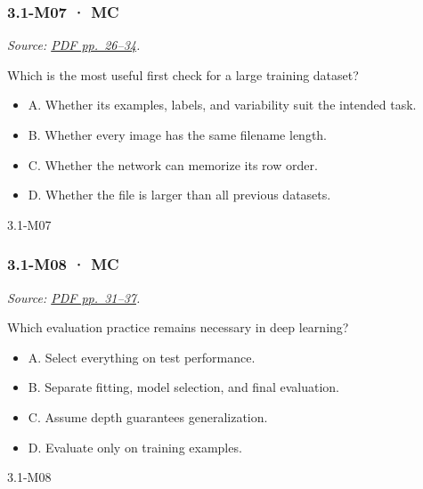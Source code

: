 \noindent\begin{minipage}{\linewidth}

\subsubsection{3.1-M07 · MC}\label{m07-mc-7}

\emph{Source:
\href{../Lecture\%20Slides/3.1.\%20Introduction\%20to\%20Deep\%20Learning.pdf\#page=26}{PDF
pp.~26--34}.}

Which is the most useful first check for a large training dataset?

\begin{itemize}
\tightlist
\item
  A. Whether its examples, labels, and variability suit the intended
  task.
\item
  B. Whether every image has the same filename length.
\item
  C. Whether the network can memorize its row order.
\item
  D. Whether the file is larger than all previous datasets.
\end{itemize}

\begin{solution}[8mm]{3.1-M07}

\end{solution}
\end{minipage}\par\medskip

\noindent\begin{minipage}{\linewidth}

\subsubsection{3.1-M08 · MC}\label{m08-mc-7}

\emph{Source:
\href{../Lecture\%20Slides/3.1.\%20Introduction\%20to\%20Deep\%20Learning.pdf\#page=31}{PDF
pp.~31--37}.}

Which evaluation practice remains necessary in deep learning?

\begin{itemize}
\tightlist
\item
  A. Select everything on test performance.
\item
  B. Separate fitting, model selection, and final evaluation.
\item
  C. Assume depth guarantees generalization.
\item
  D. Evaluate only on training examples.
\end{itemize}

\begin{solution}[8mm]{3.1-M08}

\end{solution}
\end{minipage}\par\medskip


